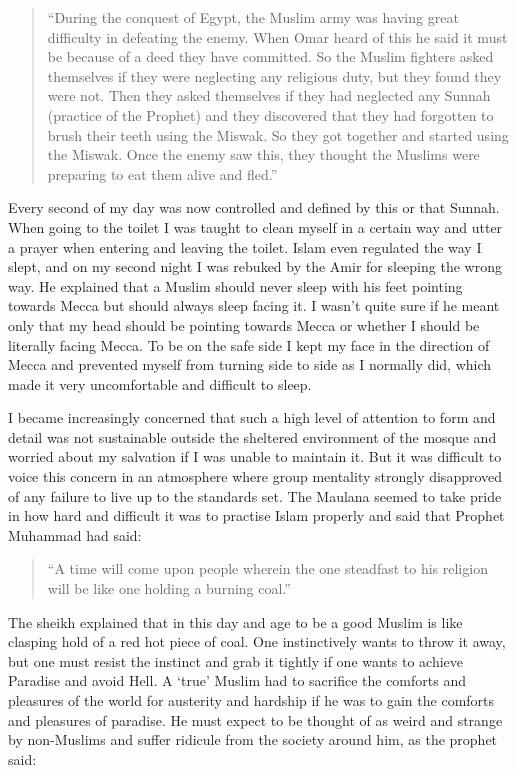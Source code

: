 \documentclass[12pt]{memoir}
\newcommand{\cor}[2]{#2} %
\def\–{-\hskip0pt}
\begin{document}
\begin{quote}
“During the conquest of Egypt,
the Muslim army was having great difficulty in defeating the enemy.
When Omar heard of this he said it must be
because of a deed they have committed.
So the Muslim fighters asked themselves
if they were neglecting any religious duty, but they found they were not.
Then they asked themselves if they had neglected any Sunnah
(practice of the Prophet) and they discovered
that they had forgotten to brush their teeth using the Miswak.
So they got together and started using the Miswak.
Once the enemy saw this,
they thought the Muslims were preparing to eat them alive and fled.”
\end{quote}

Every second of my day was now controlled and defined by this or that Sunnah.
When going to the toilet I was taught to clean myself in a certain way
and utter a prayer when entering and leaving the toilet.
Islam even regulated the way I slept,
and on my second night I was rebuked by the Amir for sleeping the wrong way.
He explained that a Muslim should never sleep with his feet pointing
towards Mecca but should always sleep facing it.
I wasn’t quite sure if he meant only that my head should be pointing
towards Mecca or whether I should be literally facing Mecca.
To be on the safe side I kept my face in the direction of Mecca
and prevented myself from turning side to side as I normally did,
which made it very uncomfortable and difficult to sleep.

I became increasingly concerned that such a high level of attention to form
and detail was not sustainable outside the sheltered environment of the mosque
and worried about my salvation if I was unable to maintain it.
But it was difficult to voice this concern in an atmosphere
where group mentality strongly disapproved of any failure
to live up to the standards set.
The Maulana seemed to take pride in how hard and difficult it was
to practise Islam properly and said that Prophet Muhammad had said:

\begin{quote}
“A time will come upon people wherein the one steadfast
to his religion will be like one holding a burning coal.”
\end{quote}

The sheikh explained that in this day and age to be a good Muslim
is like clasping hold of a red hot piece of coal.
One instinctively wants to throw it away,
but one must resist the instinct and grab it tightly
if one wants to achieve Paradise and avoid Hell.
A ‘true’ Muslim had to sacrifice the comforts
and pleasures of the world for austerity
and hardship if he was to gain the comforts and pleasures of paradise.
He must expect to be thought of as \cor{a}{} weird
and strange by non\–Muslims and suffer ridicule from the society around him,
as the prophet said:
\end{document}
